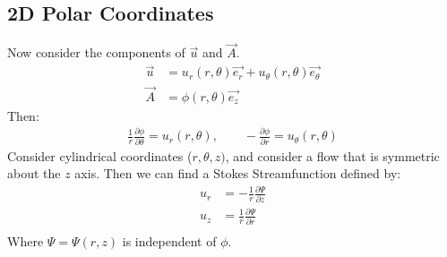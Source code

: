 \documentclass[../Main.tex]{subfiles}
\begin{document}
\subsection{2D Polar Coordinates}
Now consider the components of $\vec{u}$ and $\vec{A}$.
\begin{align*}
    \vec{u} &= u_r(r, \theta)\vec{e_r} + u_\theta(r, \theta) \vec{e_\theta} \\
    \vec{A} &= \phi(r, \theta) \vec{e_z}
\end{align*}
Then:
\begin{align*}
    \frac1r \frac{\partial \phi}{\partial \theta} = u_r(r, \theta),\qquad -\frac{\partial \phi}{\partial r} = u_\theta(r, \theta)
\end{align*}
Consider cylindrical coordinates ($r, \theta, z)$, and consider a flow that is symmetric about the $z$ axis. Then we can find a Stokes Streamfunction defined by:
\begin{align*}
    u_r &= -\frac1r \frac{\partial \Psi}{\partial z} \\
    u_z &= \frac1r \frac{\partial \Psi}{\partial r} \\
\end{align*}
Where $\Psi = \Psi(r, z)$ is independent of $\phi$.
\end{document}
